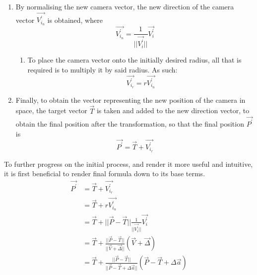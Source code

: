 \begin{enumerate}
    \begin{equation}
        \vec{V^\prime_i} = \vec{V} + \vec{\Delta} = \vec{P} - \vec{T} + \vec{\Delta}
    \end{equation}
    \begin{enumerate}
        \item Note that the distance $||\vec{V^\prime_i}|| \neq ||\vec{V}||$. As such the distance between the new position and the target no longer equals $r$, meaning that the camera is no longer along the desired circle of radius $r$.
    \end{enumerate}
    \item By normalising the new camera vector, the new direction of the camera vector $\vec{V^\prime_{i_n}}$ is obtained, where
    \begin{equation}
        \vec{V^\prime_{i_n}} = \frac{1}{||\vec{V^\prime_i}||}\vec{V^\prime_i}
    \end{equation}
    \begin{enumerate}
        \item To place the camera vector onto the initially desired radius, all that is required is to multiply it by said radius. As such:
        \begin{equation}
            \vec{V^\prime_{i_r}} = r\vec{V^\prime_{i_n}}
        \end{equation}
    \end{enumerate}
    \item Finally, to obtain the vector representing the new position of the camera in space, the target vector $\vec{T}$ is taken and added to the new direction vector, to obtain the final position after the transformation, so that the final position $\vec{P^\prime}$ is
    \begin{equation}
        \vec{P^\prime} = \vec{T} + \vec{V^\prime_{i_r}}
    \end{equation}
\end{enumerate}

To further progress on the initial process, and render it more useful and intuitive, it is first beneficial to render final formula down to its base terms.
\begin{align}
    {\vec{P^\prime}} &= \vec{T} + \vec{V^\prime_{i_r}}\nonumber\\
    &= \vec{T} + r\vec{V^\prime_{i_n}}\nonumber\\
    &= \vec{T} + ||\vec{P} - \vec{T}||\frac{1}{||\vec{V^\prime_i}||}\vec{V^\prime_i}\nonumber\\
    &= \vec{T} + \frac{||\vec{P} - \vec{T}||}{||\vec{V} + \vec{\Delta}||}(\vec{V} + \vec{\Delta})\nonumber\\
    &= \vec{T} + \frac{||\vec{P} - \vec{T}||}{||\vec{P} - \vec{T} + \Delta\vec{a}||}(\vec{P} - \vec{T} + \Delta\vec{a})
\end{align}

